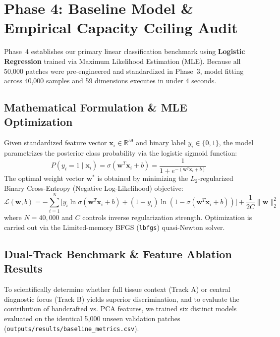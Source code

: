 \documentclass[11pt,a4paper]{article}
\begin{document}
\section{Phase 4: Baseline Model \& Empirical Capacity Ceiling Audit}

Phase~4 establishes our primary linear classification benchmark using \textbf{Logistic Regression} trained via Maximum Likelihood Estimation (MLE). Because all 50,000 patches were pre-engineered and standardized in Phase~3, model fitting across 40,000 samples and 59 dimensions executes in under 4 seconds.

\subsection{Mathematical Formulation \& MLE Optimization}
Given standardized feature vector $\mathbf{x}_i \in \mathbb{R}^{59}$ and binary label $y_i \in \{0, 1\}$, the model parametrizes the posterior class probability via the logistic sigmoid function:
\begin{equation}
    P(y_i = 1 \mid \mathbf{x}_i) = \sigma(\mathbf{w}^T \mathbf{x}_i + b) = \frac{1}{1 + e^{-(\mathbf{w}^T \mathbf{x}_i + b)}}
\end{equation}
The optimal weight vector $\mathbf{w}^*$ is obtained by minimizing the $L_2$-regularized Binary Cross-Entropy (Negative Log-Likelihood) objective:
\begin{equation}
    \mathcal{L}(\mathbf{w}, b) = -\sum_{i=1}^N \Big[ y_i \ln \sigma(\mathbf{w}^T \mathbf{x}_i + b) + (1 - y_i) \ln (1 - \sigma(\mathbf{w}^T \mathbf{x}_i + b)) \Big] + \frac{1}{2C} \|\mathbf{w}\|_2^2
\end{equation}
where $N = 40,000$ and $C$ controls inverse regularization strength. Optimization is carried out via the Limited-memory BFGS (\texttt{lbfgs}) quasi-Newton solver.

\subsection{Dual-Track Benchmark \& Feature Ablation Results}
To scientifically determine whether full tissue context (Track A) or central diagnostic focus (Track B) yields superior discrimination, and to evaluate the contribution of handcrafted vs. PCA features, we trained six distinct models evaluated on the identical 5,000 unseen validation patches (\texttt{outputs/results/baseline\_metrics.csv}).
\end{document}
